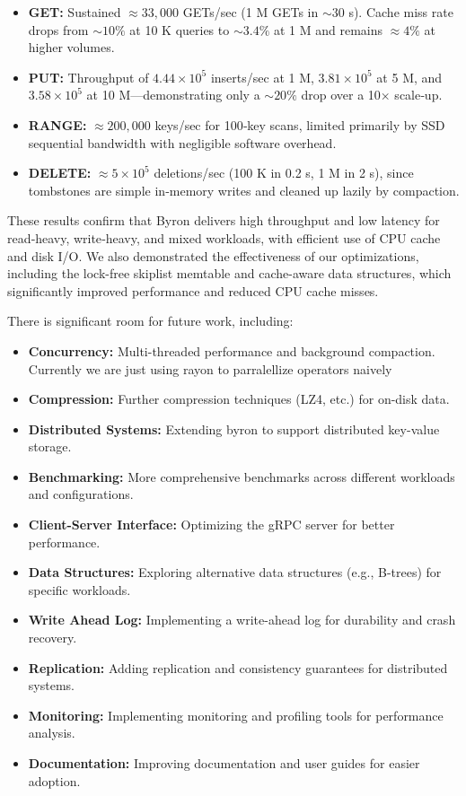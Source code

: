 \documentclass[10pt]{article}
\begin{document}
\begin{itemize}[leftmargin=1em,itemsep=0.5ex]
  \item \textbf{GET:} Sustained \(\approx33{,}000\) GETs/sec (1 M GETs in \(\sim30\) s). Cache miss rate drops from \(\sim10\%\) at 10 K queries to \(\sim3.4\%\) at 1 M and remains \(\approx4\%\) at higher volumes.
  \item \textbf{PUT:} Throughput of \(4.44\times10^5\) inserts/sec at 1 M, \(3.81\times10^5\) at 5 M, and \(3.58\times10^5\) at 10 M—demonstrating only a \(\sim20\%\) drop over a 10× scale‐up.
  \item \textbf{RANGE:} \(\approx200{,}000\) keys/sec for 100‐key scans, limited primarily by SSD sequential bandwidth with negligible software overhead.
  \item \textbf{DELETE:} \(\approx5\times10^5\) deletions/sec (100 K in 0.2 s, 1 M in 2 s), since tombstones are simple in‐memory writes and cleaned up lazily by compaction.
\end{itemize}

These results confirm that Byron delivers high throughput and low latency for read‐heavy, write‐heavy, and mixed workloads, with efficient use of CPU cache and disk I/O.  
We also demonstrated the effectiveness of our optimizations, including the lock-free skiplist memtable and cache-aware data structures, which significantly improved performance and reduced CPU cache misses.

There is significant room for future work, including:
\begin{itemize}[leftmargin=1em,itemsep=0.5ex]
  \item \textbf{Concurrency:} Multi-threaded performance and background compaction. Currently we are just using rayon to parralellize operators naively
  \item \textbf{Compression:} Further compression techniques (LZ4, etc.) for on-disk data.
  \item \textbf{Distributed Systems:} Extending byron to support distributed key-value storage.
  \item \textbf{Benchmarking:} More comprehensive benchmarks across different workloads and configurations.
  \item \textbf{Client-Server Interface:} Optimizing the gRPC server for better performance.
  \item \textbf{Data Structures:} Exploring alternative data structures (e.g., B-trees) for specific workloads.
  \item \textbf{Write Ahead Log:} Implementing a write-ahead log for durability and crash recovery.
  \item \textbf{Replication:} Adding replication and consistency guarantees for distributed systems.
  \item \textbf{Monitoring:} Implementing monitoring and profiling tools for performance analysis.
  \item \textbf{Documentation:} Improving documentation and user guides for easier adoption.
\end{itemize}
\end{document}
